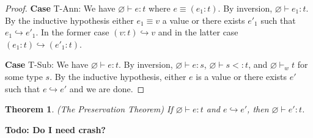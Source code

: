 \documentclass[11pt]{article}
\newtheorem{theorem}{Theorem}%
\newcommand{\col}{\mathbin{:}}       %
\begin{document}
\begin{proof}
{\bf Case} {\sc T-Ann}: We have $\varnothing \vdash e : t$ where $e \equiv (e_1\col t)$. By inversion, $\varnothing \vdash e_1 : t$. By the inductive hypothesis either $e_1 \equiv v$ a value or there exists $e'_1$ such that $e_1 \hookrightarrow e'_1$. In the former case $(v\col t) \hookrightarrow v$ and in the latter case $(e_1\col t) \hookrightarrow (e'_1\col t)$.

{\bf Case} {\sc T-Sub}: We have $\varnothing \vdash e : t$. By inversion, $\varnothing \vdash e : s$, $\varnothing \vdash s <: t$, and $\varnothing \vdash_w t$ for some type $s$. By the inductive hypothesis, either $e$ is a value or there exists $e'$ such that $e \hookrightarrow e'$ and we are done.
\end{proof}

\begin{theorem}(The Preservation Theorem)
If $\varnothing \vdash e : t$ and $e \hookrightarrow e'$, then $\varnothing \vdash e' : t$.	
\end{theorem} {\bf Todo: Do I need crash?}
\end{document}
